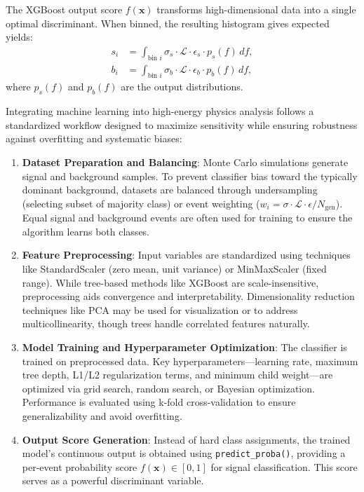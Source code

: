 The XGBoost output score $f(\mathbf{x})$ transforms high-dimensional data into a single optimal discriminant. When binned, the resulting histogram gives expected yields:
\begin{align}
s_i &= \int_{\text{bin } i} \sigma_s \cdot \mathcal{L} \cdot \epsilon_s \cdot p_s(f) \, df, \\
b_i &= \int_{\text{bin } i} \sigma_b \cdot \mathcal{L} \cdot \epsilon_b \cdot p_b(f) \, df,
\end{align}
where $p_s(f)$ and $p_b(f)$ are the output distributions. 

Integrating machine learning into high-energy physics analysis follows a standardized workflow designed to maximize sensitivity while ensuring robustness against overfitting and systematic biases:

\begin{enumerate}
    \item \textbf{Dataset Preparation and Balancing}: Monte Carlo simulations generate signal and background samples. To prevent classifier bias toward the typically dominant background, datasets are balanced through undersampling (selecting subset of majority class) or event weighting ($w_i = \sigma \cdot \mathcal{L} \cdot \epsilon / N_{\text{gen}}$). Equal signal and background events are often used for training to ensure the algorithm learns both classes.
    
    \item \textbf{Feature Preprocessing}: Input variables are standardized using techniques like StandardScaler (zero mean, unit variance) or MinMaxScaler (fixed range). While tree-based methods like XGBoost are scale-insensitive, preprocessing aids convergence and interpretability. Dimensionality reduction techniques like PCA may be used for visualization or to address multicollinearity, though trees handle correlated features naturally.
    
    \item \textbf{Model Training and Hyperparameter Optimization}: The classifier is trained on preprocessed data. Key hyperparameters—learning rate, maximum tree depth, L1/L2 regularization terms, and minimum child weight—are optimized via grid search, random search, or Bayesian optimization. Performance is evaluated using k-fold cross-validation to ensure generalizability and avoid overfitting.
    
    \item \textbf{Output Score Generation}: Instead of hard class assignments, the trained model's continuous output is obtained using \texttt{predict\_proba()}, providing a per-event probability score $f(\mathbf{x}) \in [0, 1]$ for signal classification. This score serves as a powerful discriminant variable.
    

\end{enumerate}
